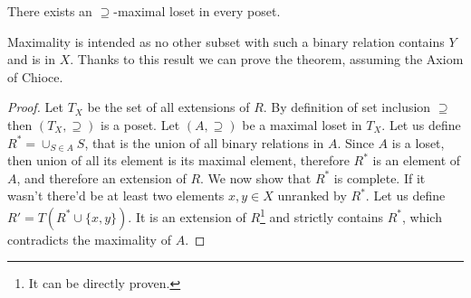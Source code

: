 \begin{axiom}
    There exists an $\supseteq$-maximal loset in every poset.
\end{axiom}

Maximality is intended as no other subset with such a binary relation contains $Y$ and is in $X$. Thanks to this result we can prove the theorem, assuming the Axiom of Chioce.

\begin{proof}
    Let $T_X$ be the set of all extensions of $R$. By definition of set inclusion $\supseteq$ then $(T_X,\supseteq)$ is a poset. Let $(A,\supseteq)$ be a maximal loset in $T_X$. 
    Let us define $R^{\ast}=\cup_{S\in A}S$, that is the union of all binary relations in $A$. Since $A$ is a loset, then union of all its element is its maximal element, therefore $R^{\ast}$ 
    is an element of $A$, and therefore an extension of $R$. We now show that $R^{\ast}$ is complete. If it wasn't there'd be at least two elements $x,y\in X$ unranked by $R^{\ast}$. 
    Let us define $R'=T\left(R^{\ast}\cup\{x,y\}\right)$. It is an extension of $R$\footnote{It can be directly proven.} and strictly contains $R^{\ast}$, which contradicts the maximality of $A$.
\end{proof}